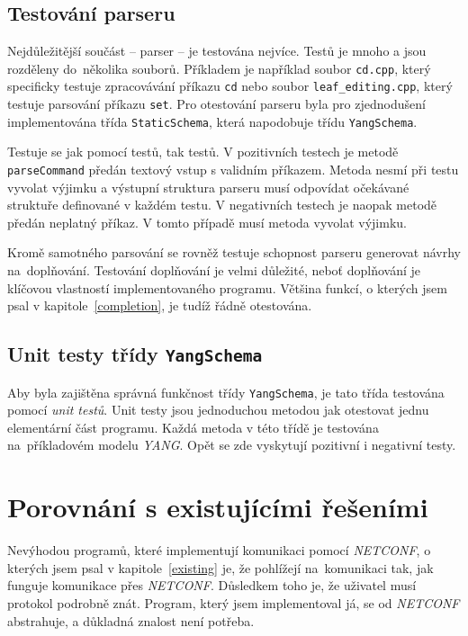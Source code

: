 \documentclass[thesis=B,czech,hidelinks]{FITthesis}[2019/03/06]
\begin{document}
\subsection{Testování parseru}
Nejdůležitější součást -- parser -- je testována nejvíce. Testů je mnoho a jsou rozděleny do~několika souborů. Příkladem je například soubor \texttt{cd.cpp}, který specificky testuje zpracovávání příkazu \texttt{cd} nebo soubor \texttt{leaf\_editing.cpp}, který testuje parsování příkazu \texttt{set}. Pro otestování parseru byla pro zjednodušení implementována třída \texttt{StaticSchema}, která napodobuje třídu \texttt{YangSchema}.

Testuje se jak pomocí  testů, tak  testů. V pozitivních testech je metodě \texttt{parseCommand} předán textový vstup s validním příkazem. Metoda nesmí při testu vyvolat výjimku a výstupní struktura parseru musí odpovídat očekávané struktuře definované v každém testu. V negativních testech je naopak metodě předán neplatný příkaz. V tomto případě musí metoda vyvolat výjimku.

Kromě samotného parsování se rovněž testuje schopnost parseru generovat návrhy na~doplňování. Testování doplňování je velmi důležité, neboť doplňování je klíčovou vlastností implementovaného programu. Většina funkcí, o kterých jsem psal v kapitole~\ref{completion}, je tudíž řádně otestována.

\subsection{Unit testy třídy \texttt{YangSchema}}
Aby byla zajištěna správná funkčnost třídy \texttt{YangSchema}, je tato třída testována pomocí \textit{unit testů}. Unit testy jsou jednoduchou metodou jak otestovat jednu elementární část programu. Každá metoda v této třídě je testována na~příkladovém modelu \textit{YANG}. Opět se zde vyskytují pozitivní i negativní testy.


\section{Porovnání s existujícími řešeními}
Nevýhodou programů, které implementují komunikaci pomocí \textit{NETCONF}, o kterých jsem psal v kapitole~\ref{existing} je, že pohlížejí na~komunikaci tak, jak funguje komunikace přes \textit{NETCONF}. Důsledkem toho je, že uživatel musí protokol podrobně znát. Program, který jsem implementoval já, se od \textit{NETCONF} abstrahuje, a důkladná znalost není potřeba.
\end{document}
